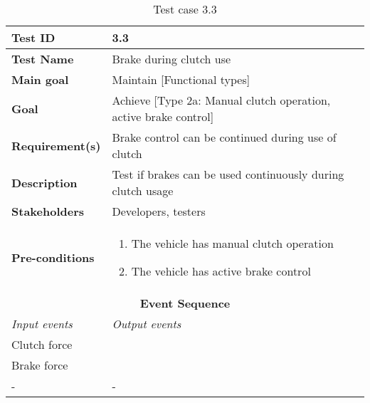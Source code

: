 \begin{table}[H]
\centering
\begin{tabularx}{\linewidth}{X|X}
  \hline
  \textbf{Test ID} & 3.3\\
  \hline
  \textbf{Test Name} &  Brake during clutch use\\
  \hline
  \textbf{Main goal} &  Maintain [Functional types]\\
  \hline
  \textbf{Goal} & Achieve [Type 2a: Manual clutch operation, active brake control] \\
  \hline
  \textbf{Requirement(s)} &  Brake control can be continued during use of clutch\\
  \hline
  \textbf{Description} &  Test if brakes can be used continuously during clutch usage\\
  \hline
  \textbf{Stakeholders} &  Developers, testers\\
  \hline
  \textbf{Pre-conditions} &  
  \begin{enumerate}
      \item The vehicle has manual clutch operation
      \item The vehicle has active brake control
  \end{enumerate}\\
  \hline
  \multicolumn{2}{c}{\textbf{Event Sequence}} \\
  \hline
  \textit{Input events} & \textit{Output events} \\
  \hline
   Clutch force &  \\
  \hline
   Brake force &  \\
  \hline
  - & - \\
  \hline
  \end{tabularx}
\caption{\label{tab_caseX} Test case 3.3}
\end{table}

